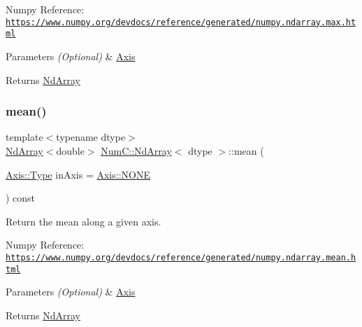 Numpy Reference\+: \href{https://www.numpy.org/devdocs/reference/generated/numpy.ndarray.max.html}{\tt https\+://www.\+numpy.\+org/devdocs/reference/generated/numpy.\+ndarray.\+max.\+html}


\begin{DoxyParams}{Parameters}
{\em (\+Optional)} & \mbox{\hyperlink{struct_num_c_1_1_axis}{Axis}} \\
\hline
\end{DoxyParams}
\begin{DoxyReturn}{Returns}
\mbox{\hyperlink{class_num_c_1_1_nd_array}{Nd\+Array}} 
\end{DoxyReturn}
\mbox{\label{class_num_c_1_1_nd_array_af4176e740965e272fa24fda54dd2e875}} 
\subsubsection{\texorpdfstring{mean()}{mean()}}
{\footnotesize\ttfamily template$<$typename dtype$>$ \\
\mbox{\hyperlink{class_num_c_1_1_nd_array}{Nd\+Array}}$<$double$>$ \mbox{\hyperlink{class_num_c_1_1_nd_array}{Num\+C\+::\+Nd\+Array}}$<$ dtype $>$\+::mean (\begin{DoxyParamCaption}\item[{\mbox{\hyperlink{struct_num_c_1_1_axis_a8e689044ef1941a03482e730c5e7ebb3}{Axis\+::\+Type}}}]{in\+Axis = {\ttfamily \mbox{\hyperlink{struct_num_c_1_1_axis_a8e689044ef1941a03482e730c5e7ebb3a0ae033c4226f7184bf0050b101e7ed94}{Axis\+::\+N\+O\+NE}}} }\end{DoxyParamCaption}) const\hspace{0.3cm}{\ttfamily [inline]}}

Return the mean along a given axis.

Numpy Reference\+: \href{https://www.numpy.org/devdocs/reference/generated/numpy.ndarray.mean.html}{\tt https\+://www.\+numpy.\+org/devdocs/reference/generated/numpy.\+ndarray.\+mean.\+html}


\begin{DoxyParams}{Parameters}
{\em (\+Optional)} & \mbox{\hyperlink{struct_num_c_1_1_axis}{Axis}} \\
\hline
\end{DoxyParams}
\begin{DoxyReturn}{Returns}
\mbox{\hyperlink{class_num_c_1_1_nd_array}{Nd\+Array}} 
\end{DoxyReturn}
\mbox{\label{class_num_c_1_1_nd_array_a8ac6430930f379b06f650db8ca7aa62b}} 
